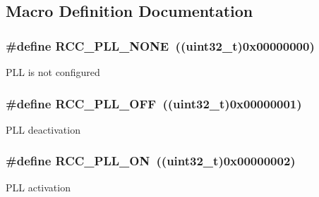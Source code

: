 \subsection{Macro Definition Documentation}
\hypertarget{group___r_c_c___p_l_l___config_gae47a612f8e15c32917ee2181362d88f3}{
\subsubsection[{R\-C\-C\-\_\-\-P\-L\-L\-\_\-\-N\-O\-N\-E}]{\setlength{\rightskip}{0pt plus 5cm}\#define R\-C\-C\-\_\-\-P\-L\-L\-\_\-\-N\-O\-N\-E~((uint32\-\_\-t)0x00000000)}}\label{group___r_c_c___p_l_l___config_gae47a612f8e15c32917ee2181362d88f3}
P\-L\-L is not configured \hypertarget{group___r_c_c___p_l_l___config_ga3a8d5c8bcb101c6ca1a574729acfa903}{
\subsubsection[{R\-C\-C\-\_\-\-P\-L\-L\-\_\-\-O\-F\-F}]{\setlength{\rightskip}{0pt plus 5cm}\#define R\-C\-C\-\_\-\-P\-L\-L\-\_\-\-O\-F\-F~((uint32\-\_\-t)0x00000001)}}\label{group___r_c_c___p_l_l___config_ga3a8d5c8bcb101c6ca1a574729acfa903}
P\-L\-L deactivation \hypertarget{group___r_c_c___p_l_l___config_gaf86dbee130304ba5760818f56d34ec91}{
\subsubsection[{R\-C\-C\-\_\-\-P\-L\-L\-\_\-\-O\-N}]{\setlength{\rightskip}{0pt plus 5cm}\#define R\-C\-C\-\_\-\-P\-L\-L\-\_\-\-O\-N~((uint32\-\_\-t)0x00000002)}}\label{group___r_c_c___p_l_l___config_gaf86dbee130304ba5760818f56d34ec91}
P\-L\-L activation 